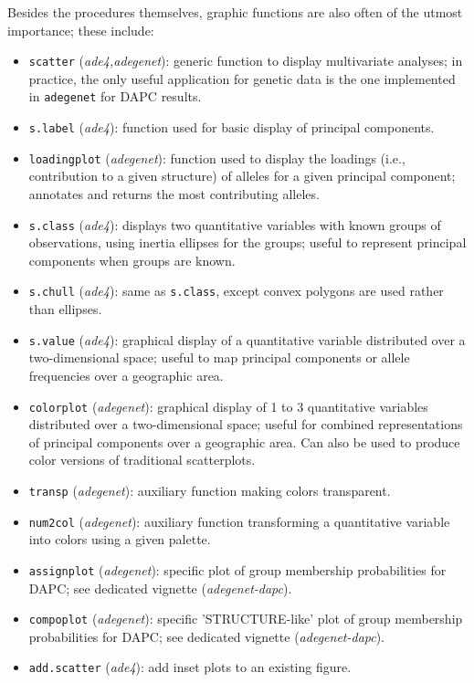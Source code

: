 \documentclass{article}
\begin{document}
Besides the procedures themselves, graphic functions are also often of the utmost importance; these include:
\begin{itemize}
  \item \texttt{scatter} (\textit{ade4,adegenet}): generic function to display multivariate
    analyses; in practice, the only useful application for genetic data is the one implemented in
    \texttt{adegenet} for DAPC results.
  \item \texttt{s.label} (\textit{ade4}): function used for basic display of principal components.
  \item \texttt{loadingplot} (\textit{adegenet}): function used to display the loadings (i.e.,
    contribution to a given structure) of alleles for a given principal component; annotates and returns the most
    contributing alleles.
  \item \texttt{s.class} (\textit{ade4}): displays two quantitative variables with known groups of
    observations, using inertia ellipses for the groups; useful to represent principal components
    when groups are known.
  \item \texttt{s.chull} (\textit{ade4}): same as \texttt{s.class}, except convex polygons are used
    rather than ellipses.
  \item \texttt{s.value} (\textit{ade4}): graphical display of a quantitative variable distributed
    over a two-dimensional space; useful to map principal components or allele frequencies over a
    geographic area.
  \item \texttt{colorplot} (\textit{adegenet}): graphical display of 1 to 3 quantitative variables distributed
    over a two-dimensional space; useful for combined representations of principal components over a geographic area.
    Can also be used to produce color versions of traditional scatterplots.
  \item \texttt{transp} (\textit{adegenet}): auxiliary function making colors transparent.
  \item \texttt{num2col} (\textit{adegenet}): auxiliary function transforming a quantitative
    variable into colors using a given palette.
  \item \texttt{assignplot} (\textit{adegenet}): specific plot of group membership probabilities for
    DAPC; see dedicated vignette (\textit{adegenet-dapc}).
  \item \texttt{compoplot} (\textit{adegenet}): specific 'STRUCTURE-like' plot of group membership probabilities for
    DAPC; see dedicated vignette (\textit{adegenet-dapc}).
  \item \texttt{add.scatter} (\textit{ade4}): add inset plots to an existing figure.
\end{itemize}
\end{document}
